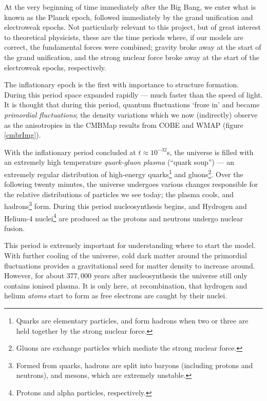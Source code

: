 \documentclass[11pt,a4paper]{article}
\begin{document}
At the very beginning of time immediately after the Big Bang, we enter what is known as the Planck epoch, followed immediately by the grand unification and electroweak epochs. Not particularly relevant to this project, but of great interest to theoretical physicists, these are the time periods where, if our models are correct, the fundamental forces were combined; gravity broke away at the start of the grand unification, and the strong nuclear force broke away at the start of the electroweak epochs, respectively. 

The inflationary epoch is the first with importance to structure formation. During this period space expanded rapidly --- much faster than the speed of light. It is thought that during this period, quantum fluctuations `froze in' \cite{QC} and became \emph{primordial fluctuations}; the density variations which we now (indirectly) observe as the anisotropies in the CMBMap results from COBE and WMAP (figure \ref{cmbrImg}).

With the inflationary period concluded at $t\approx10^{-32}$s, the universe is filled with an extremely high temperature \emph{quark-gluon plasma} (``quark soup'') --- an extremely regular distribution of high-energy quarks\footnote{Quarks are elementary particles, and form hadrons when two or three are held together by the strong nuclear force.} and gluons\footnote{Gluons are exchange particles which mediate the strong nuclear force.}. Over the following twenty minutes, the universe undergoes various changes responsible for the relative distributions of particles we see today; the plasma cools, and hadrons\footnote{Formed from quarks, hadrons are split into baryons (including protons and neutrons), and mesons, which are extremely unstable.} form. During this period nucleosynthesis begins, and Hydrogen and Helium-4 nuclei\footnote{Protons and alpha particles, respectively.} are produced as the protons and neutrons undergo nuclear fusion. 

This period is extremely important for understanding where to start the model. With further cooling of the universe, cold dark matter around the primordial fluctuations provides a gravitational seed for matter density to increase around. However, for about $377,000$ years after nucleosynthesis the universe still only contains ionised plasma. It is only here, at recombination, that hydrogen and helium \emph{atoms} start to form as free electrons are caught by their nuclei.
\end{document}

